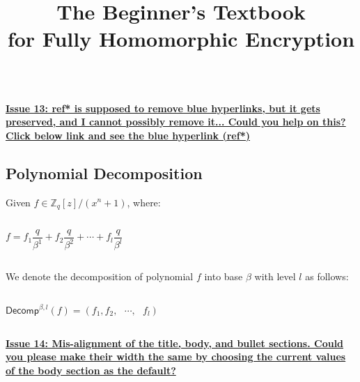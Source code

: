 $ $

\underline{\textbf{Issue 13: ref* is supposed to remove blue hyperlinks, but it gets preserved, and I cannot possibly remove it... Could you help on this? Click below link and see the blue hyperlink (ref*)}}


\subsection{Polynomial Decomposition}
\label{subsec:poly-decomp}

\begin{tcolorbox}[title={\textbf{\tboxlabel{\ref*{subsec:poly-decomp}} Polynomial Decomposition}}]

Given $f \in \mathbb{Z}_q[z]/(x^n+1)$, where:

$ $

$f = f_1 \dfrac{q}{\beta^1} + f _2\dfrac{q}{\beta^2} + \cdots + f_l \dfrac{q}{\beta^l}  $

$ $

We denote the decomposition of polynomial $f$ into base $\beta$ with level $l$ as follows:

$ $

$\textsf{Decomp}^{\beta, l}(f) = (f_1, f_2, \text{ } \cdots , \text{ } f_l)$
 $ $
\end{tcolorbox}

$ $

\underline{\textbf{Issue 14: Mis-alignment of the title, body, and bullet sections. Could you please make their width the same by choosing the current values of the body section as the default?}}

\title{\Huge{\textbf{The Beginner's Textbook}}\\ \Huge{\textbf{for Fully Homomorphic Encryption}}}

\begin{titlingpage}
\maketitle
\end{titlingpage}

